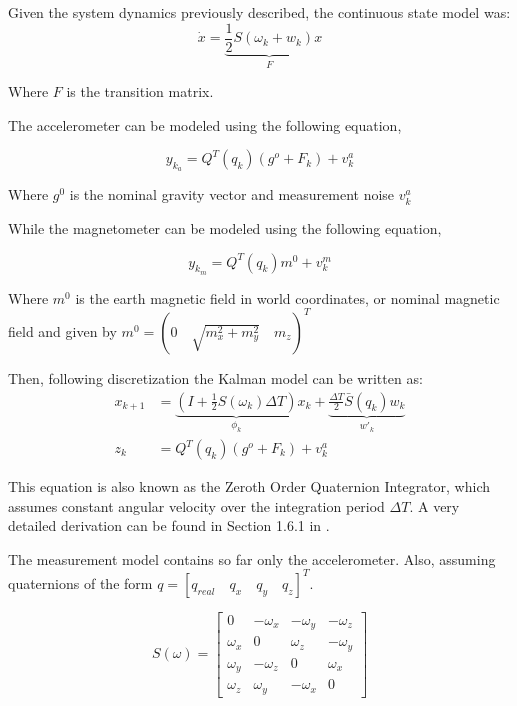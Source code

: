 \documentclass[a4paper,10pt]{article}
\begin{document}
\begin{itemize}
Given the system dynamics previously described, the continuous state model was:
\begin{equation}
  \dot{x} = \underbrace{\frac{1}{2} S(\omega_k + w_k)}_{F} x
\end{equation}

Where $F$ is the transition matrix. 

The accelerometer can be modeled using the following equation,

\begin{equation}
 y_{k_a} = Q^T(q_k)(g^o + F_k) + v^a_k
\end{equation}

Where $g^0$ is the nominal gravity vector and measurement noise $v^a_k$

While the magnetometer can be modeled using the following equation,

\begin{equation}
 y_{k_m} = Q^T(q_k)m^0 + v^m_k
\end{equation}

Where $m^0$ is the earth magnetic field in world coordinates, or nominal magnetic field and given by $m^0 = (0 \quad \sqrt{m^2_x + m^2_y} \quad m_z)^T$

Then, following discretization the Kalman model can be written as:
\begin{align}
 x_{k+1} &= \underbrace{\left(I + \frac{1}{2}S(\omega_k)\Delta T\right)}_{\phi_k} x_k + \underbrace{\frac{\Delta T}{2}\bar{S}(q_k)w_k }_{w'_k}\\ 
 z_{k}   &=  Q^T(q_k)(g^o + F_k) + v^a_k
\end{align}

This equation is also known as the Zeroth Order Quaternion Integrator, which assumes constant angular velocity over the integration period $\Delta T$. A very detailed derivation can be found in Section 1.6.1 in \cite{Trawny2005}.

The measurement model contains so far only the accelerometer. Also, assuming quaternions of the form $q = [q_{real} \quad q_x \quad q_y \quad q_z]^T$. 

\begin{equation}
 S(\omega) = \left[
 \begin{matrix}
  0 	   & -\omega_x & -\omega_y & -\omega_z\\
  \omega_x & 0	       &  \omega_z & -\omega_y\\
  \omega_y & -\omega_z &  0	   &  \omega_x\\
  \omega_z &  \omega_y & -\omega_x &  0
 \end{matrix}\right]
\end{equation}


\end{itemize}
\end{document}

